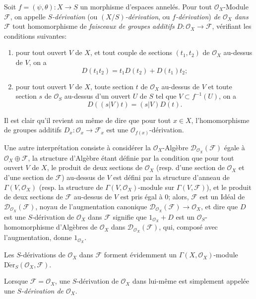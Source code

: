 \begin{env}[16.5.1]
Soit $f=(\psi,\theta):X\to S$ un morphisme d'espaces annelés. Pour tout
$\mathcal{O}_X$-Module $\mathscr{F}$, on appelle \emph{$S$-dérivation}
(ou \emph{$(X/S)$-dérivation}, ou \emph{$f$-dérivation}) \emph{de
$\mathcal{O}_X$ dans $\mathscr{F}$} tout homomorphisme de \emph{faisceaux de
groupes additifs} $D:\mathcal{O}_X\to\mathscr{F}$, vérifiant les conditions
suivantes:
\begin{enumerate}
\item[(a)] pour tout ouvert $V$ de $X$, et tout couple de sections
$(t_1,t_2)$ de $\mathcal{O}_X$ au-dessus de $V$, on a
\[
  D(t_1t_2)=t_1D(t_2)+D(t_1)t_2;
  \tag{16.5.1.1}
  \label{IV.16.5.1.1}
\]
\item[(b)] pour tout ouvert $V$ de $X$, toute section $t$ de $\mathcal{O}_X$
au-dessus de $V$ et toute section $s$ de $\mathcal{O}_S$ au-dessus d'un ouvert
$U$ de $S$ tel que $V\subset f^{-1}(U)$, on a
\[
  D((s|V)t)=(s|V)D(t).
  \tag{16.5.1.2}
  \label{IV.16.5.1.2}
\]
\end{enumerate}
Il est clair qu'il revient au même de dire que pour tout $x\in X$,
l'homomorphisme de groupes additifs
$D_x:\mathcal{O}_x\to\mathscr{F}_x$ est une
$\mathcal{O}_{f(x)}$-dérivation.

Une autre interprétation consiste à considérer la $\mathcal{O}_X$-Algèbre
$\mathscr{D}_{\mathcal{O}_X}(\mathscr{F})$ égale à
$\mathcal{O}_X\oplus\mathscr{F}$, la structure d'Algèbre étant définie par la
condition que pour tout ouvert $V$ de $X$, le produit de deux sections de
$\mathcal{O}_X$ (resp. d'une section de $\mathcal{O}_X$ et d'une section de
$\mathscr{F}$) au-dessus de $V$ est défini par la structure d'anneau de
$\Gamma(V,\mathcal{O}_X)$ (resp. la structure de
$\Gamma(V,\mathcal{O}_X)$-module sur $\Gamma(V,\mathscr{F})$), et le produit de
deux sections de $\mathscr{F}$ au-dessus de $V$ est pris égal à 0; alors,
$\mathscr{F}$ est un Idéal de
$\mathscr{D}_{\mathcal{O}_X}(\mathscr{F})$, noyau de l'augmentation canonique
$\mathscr{D}_{\mathcal{O}_X}(\mathscr{F})\to\mathcal{O}_X$, et dire que $D$
est une $S$-dérivation de $\mathcal{O}_X$ dans $\mathscr{F}$ signifie que
$1_{\mathcal{O}_X}+D$ est un $\mathcal{O}_S$-homomorphisme d'Algèbres de
$\mathcal{O}_X$ dans $\mathscr{D}_{\mathcal{O}_X}(\mathscr{F})$, qui, composé
avec l'augmentation, donne $1_{\mathcal{O}_X}$.

Les $S$-dérivations de $\mathcal{O}_X$ dans $\mathscr{F}$ forment évidemment
un $\Gamma(X,\mathcal{O}_X)$-module
$\operatorname{D\acute{e}r}_S(\mathcal{O}_X,\mathscr{F})$.

Lorsque $\mathscr{F}=\mathcal{O}_X$, une $S$-dérivation de $\mathcal{O}_X$ dans
lui-même est simplement appelée une \emph{$S$-dérivation de $\mathcal{O}_X$}.
\end{env}

